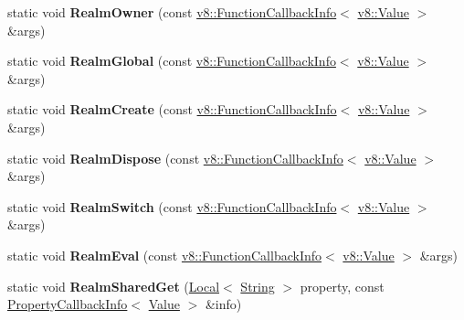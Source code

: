 \begin{DoxyCompactItemize}
\item 
static void {\bfseries Realm\+Owner} (const \hyperlink{classv8_1_1_function_callback_info}{v8\+::\+Function\+Callback\+Info}$<$ \hyperlink{classv8_1_1_value}{v8\+::\+Value} $>$ \&args)\hypertarget{classv8_1_1_shell_a9b3772fd4ecaac0b3586e66e9c18bcde}{}\label{classv8_1_1_shell_a9b3772fd4ecaac0b3586e66e9c18bcde}

\item 
static void {\bfseries Realm\+Global} (const \hyperlink{classv8_1_1_function_callback_info}{v8\+::\+Function\+Callback\+Info}$<$ \hyperlink{classv8_1_1_value}{v8\+::\+Value} $>$ \&args)\hypertarget{classv8_1_1_shell_acee30321581bbf1c878a31ca8c54d546}{}\label{classv8_1_1_shell_acee30321581bbf1c878a31ca8c54d546}

\item 
static void {\bfseries Realm\+Create} (const \hyperlink{classv8_1_1_function_callback_info}{v8\+::\+Function\+Callback\+Info}$<$ \hyperlink{classv8_1_1_value}{v8\+::\+Value} $>$ \&args)\hypertarget{classv8_1_1_shell_a321307d1e9e6a587bbf3091195346f46}{}\label{classv8_1_1_shell_a321307d1e9e6a587bbf3091195346f46}

\item 
static void {\bfseries Realm\+Dispose} (const \hyperlink{classv8_1_1_function_callback_info}{v8\+::\+Function\+Callback\+Info}$<$ \hyperlink{classv8_1_1_value}{v8\+::\+Value} $>$ \&args)\hypertarget{classv8_1_1_shell_a8bb9ca4c151b7ed3e6bdd64d3f814a65}{}\label{classv8_1_1_shell_a8bb9ca4c151b7ed3e6bdd64d3f814a65}

\item 
static void {\bfseries Realm\+Switch} (const \hyperlink{classv8_1_1_function_callback_info}{v8\+::\+Function\+Callback\+Info}$<$ \hyperlink{classv8_1_1_value}{v8\+::\+Value} $>$ \&args)\hypertarget{classv8_1_1_shell_ab4b04a517ba41c1843ae1db5f03ee48b}{}\label{classv8_1_1_shell_ab4b04a517ba41c1843ae1db5f03ee48b}

\item 
static void {\bfseries Realm\+Eval} (const \hyperlink{classv8_1_1_function_callback_info}{v8\+::\+Function\+Callback\+Info}$<$ \hyperlink{classv8_1_1_value}{v8\+::\+Value} $>$ \&args)\hypertarget{classv8_1_1_shell_a2188e58aebf24a2991a9e5a8c6cc457c}{}\label{classv8_1_1_shell_a2188e58aebf24a2991a9e5a8c6cc457c}

\item 
static void {\bfseries Realm\+Shared\+Get} (\hyperlink{classv8_1_1_local}{Local}$<$ \hyperlink{classv8_1_1_string}{String} $>$ property, const \hyperlink{classv8_1_1_property_callback_info}{Property\+Callback\+Info}$<$ \hyperlink{classv8_1_1_value}{Value} $>$ \&info)\hypertarget{classv8_1_1_shell_a18a4d640a41f7fdc9a178e3db8408a8f}{}\label{classv8_1_1_shell_a18a4d640a41f7fdc9a178e3db8408a8f}


\end{DoxyCompactItemize}
